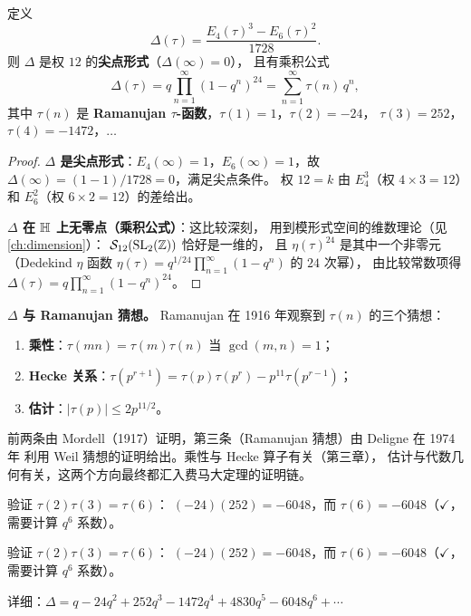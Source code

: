 \begin{proposition}[$E_4, E_6$ 与 $\Delta$]
\label{prop:E4-E6-Delta}
定义
\[
  \Delta(\tau) = \frac{E_4(\tau)^3 - E_6(\tau)^2}{1728}.
\]
则 $\Delta$ 是权 $12$ 的\textbf{尖点形式}（$\Delta(\infty) = 0$），
且有乘积公式
\[
  \Delta(\tau) = q \prod_{n=1}^{\infty}(1-q^n)^{24}
  = \sum_{n=1}^{\infty} \tau(n)\, q^n,
\]
其中 $\tau(n)$ 是 \textbf{Ramanujan $\tau$-函数}，$\tau(1) = 1$，$\tau(2) = -24$，
$\tau(3) = 252$，$\tau(4) = -1472$，$\ldots$
\end{proposition}

\begin{proof}
\textbf{$\Delta$ 是尖点形式}：$E_4(\infty) = 1$，$E_6(\infty) = 1$，故
$\Delta(\infty) = (1 - 1)/1728 = 0$，满足尖点条件。
权 $12 = k$ 由 $E_4^3$（权 $4 \times 3 = 12$）和 $E_6^2$（权 $6 \times 2 = 12$）的差给出。

\textbf{$\Delta$ 在 $\mathbb{H}$ 上无零点（乘积公式）}：这比较深刻，
用到模形式空间的维数理论（见\cref{ch:dimension}）：
$\mathcal{S}_{12}(\mathrm{SL}_2(\mathbb{Z}))$ 恰好是一维的，
且 $\eta(\tau)^{24}$ 是其中一个非零元（Dedekind $\eta$ 函数
$\eta(\tau) = q^{1/24}\prod_{n=1}^\infty(1-q^n)$ 的 $24$ 次幂），
由比较常数项得 $\Delta(\tau) = q\prod_{n=1}^\infty(1-q^n)^{24}$。
\end{proof}

\textbf{$\Delta$ 与 Ramanujan 猜想。}
Ramanujan 在 1916 年观察到 $\tau(n)$ 的三个猜想：
\begin{enumerate}
  \item \textbf{乘性}：$\tau(mn) = \tau(m)\tau(n)$ 当 $\gcd(m,n) = 1$；
  \item \textbf{Hecke 关系}：$\tau(p^{r+1}) = \tau(p)\tau(p^r) - p^{11}\tau(p^{r-1})$；
  \item \textbf{估计}：$|\tau(p)| \leq 2p^{11/2}$。
\end{enumerate}
前两条由 Mordell（1917）证明，第三条（Ramanujan 猜想）由 Deligne 在 1974 年
利用 Weil 猜想的证明给出。乘性与 Hecke 算子有关（第三章），
估计与代数几何有关，这两个方向最终都汇入费马大定理的证明链。

\begin{example}
\label{ex:tau-multiplicative}
验证 $\tau(2)\tau(3) = \tau(6)$：
$(-24)(252) = -6048$，而 $\tau(6) = -6048$（$\checkmark$，需要计算 $q^6$ 系数）。

验证 $\tau(2)\tau(3) = \tau(6)$：
$(-24)(252) = -6048$，而 $\tau(6) = -6048$（$\checkmark$，需要计算 $q^6$ 系数）。

详细：$\Delta = q - 24q^2 + 252q^3 - 1472q^4 + 4830q^5 - 6048q^6 + \cdots$
\end{example}



